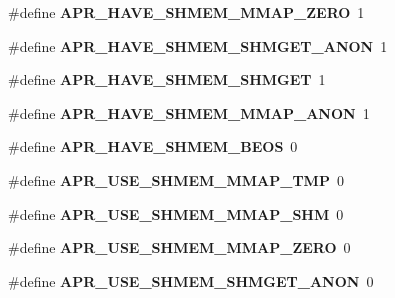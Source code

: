 \begin{DoxyCompactItemize}
\item 
\hypertarget{group__apr__platform_gae77c5864ac1e978b5cdc4613efe874b9}{\#define {\bfseries A\-P\-R\-\_\-\-H\-A\-V\-E\-\_\-\-S\-H\-M\-E\-M\-\_\-\-M\-M\-A\-P\-\_\-\-Z\-E\-R\-O}~1}\label{group__apr__platform_gae77c5864ac1e978b5cdc4613efe874b9}

\item 
\hypertarget{group__apr__platform_ga3c0e8fc59b8891eeacac290bca9df09b}{\#define {\bfseries A\-P\-R\-\_\-\-H\-A\-V\-E\-\_\-\-S\-H\-M\-E\-M\-\_\-\-S\-H\-M\-G\-E\-T\-\_\-\-A\-N\-O\-N}~1}\label{group__apr__platform_ga3c0e8fc59b8891eeacac290bca9df09b}

\item 
\hypertarget{group__apr__platform_ga35d1fadddb8c1e83a5548946d169da2a}{\#define {\bfseries A\-P\-R\-\_\-\-H\-A\-V\-E\-\_\-\-S\-H\-M\-E\-M\-\_\-\-S\-H\-M\-G\-E\-T}~1}\label{group__apr__platform_ga35d1fadddb8c1e83a5548946d169da2a}

\item 
\hypertarget{group__apr__platform_ga8237055d9f5700fdccfd173da26ff614}{\#define {\bfseries A\-P\-R\-\_\-\-H\-A\-V\-E\-\_\-\-S\-H\-M\-E\-M\-\_\-\-M\-M\-A\-P\-\_\-\-A\-N\-O\-N}~1}\label{group__apr__platform_ga8237055d9f5700fdccfd173da26ff614}

\item 
\hypertarget{group__apr__platform_ga158aa4bb703689e01adced53d16ae503}{\#define {\bfseries A\-P\-R\-\_\-\-H\-A\-V\-E\-\_\-\-S\-H\-M\-E\-M\-\_\-\-B\-E\-O\-S}~0}\label{group__apr__platform_ga158aa4bb703689e01adced53d16ae503}

\item 
\hypertarget{group__apr__platform_ga165e27e6100d65b6893d1c9b7e808536}{\#define {\bfseries A\-P\-R\-\_\-\-U\-S\-E\-\_\-\-S\-H\-M\-E\-M\-\_\-\-M\-M\-A\-P\-\_\-\-T\-M\-P}~0}\label{group__apr__platform_ga165e27e6100d65b6893d1c9b7e808536}

\item 
\hypertarget{group__apr__platform_ga38ed6a0607f8fbbe977843d84c42b02a}{\#define {\bfseries A\-P\-R\-\_\-\-U\-S\-E\-\_\-\-S\-H\-M\-E\-M\-\_\-\-M\-M\-A\-P\-\_\-\-S\-H\-M}~0}\label{group__apr__platform_ga38ed6a0607f8fbbe977843d84c42b02a}

\item 
\hypertarget{group__apr__platform_gad75204199cfa3631263fb1f1ea8abc94}{\#define {\bfseries A\-P\-R\-\_\-\-U\-S\-E\-\_\-\-S\-H\-M\-E\-M\-\_\-\-M\-M\-A\-P\-\_\-\-Z\-E\-R\-O}~0}\label{group__apr__platform_gad75204199cfa3631263fb1f1ea8abc94}

\item 
\hypertarget{group__apr__platform_gaeaedd6e1272ded14f16701b96a3ad14c}{\#define {\bfseries A\-P\-R\-\_\-\-U\-S\-E\-\_\-\-S\-H\-M\-E\-M\-\_\-\-S\-H\-M\-G\-E\-T\-\_\-\-A\-N\-O\-N}~0}\label{group__apr__platform_gaeaedd6e1272ded14f16701b96a3ad14c}


\end{DoxyCompactItemize}
